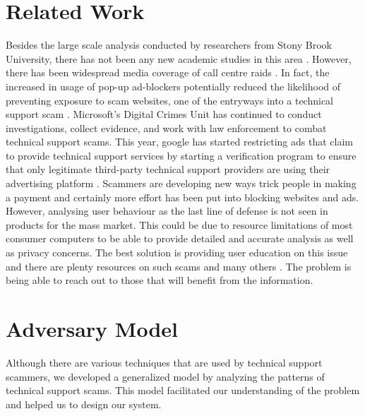 \documentclass[final]{IEEEtran}
\begin{document}
\section{Related Work} %
Besides the large scale analysis conducted by researchers from Stony Brook University, there has not been any new academic studies in this area \cite{b2}. However, there has been widespread media coverage of call centre raids \cite{b6}. In fact, the increased in usage of pop-up ad-blockers potentially reduced the likelihood  of preventing exposure to scam websites, one of the entryways into a technical support scam \cite{b7}. Microsoft's Digital Crimes Unit has continued to conduct investigations, collect evidence, and work with law enforcement to combat technical support scams. This year, google has started restricting ads that claim to provide technical support services by starting a verification program to ensure that only legitimate third-party technical support providers are using their advertising platform \cite{b8}. Scammers are developing new ways trick people in making a payment and certainly more effort has been put into blocking websites and ads. However, analysing user behaviour as the last line of defense is not seen in products for the mass market. This could be due to resource limitations of most consumer computers to be able to provide detailed and accurate analysis as well as privacy concerns. The best solution is providing user education on this issue and there are plenty resources on such scams and many others \cite{b10}. The problem is being able to reach out to those that will benefit from the information.




\section{Adversary Model} %
Although there are various techniques that are used by technical support scammers, we developed a generalized model by analyzing the patterns of technical support scams. This model facilitated our understanding of the problem and helped us to design our system.
\end{document}
